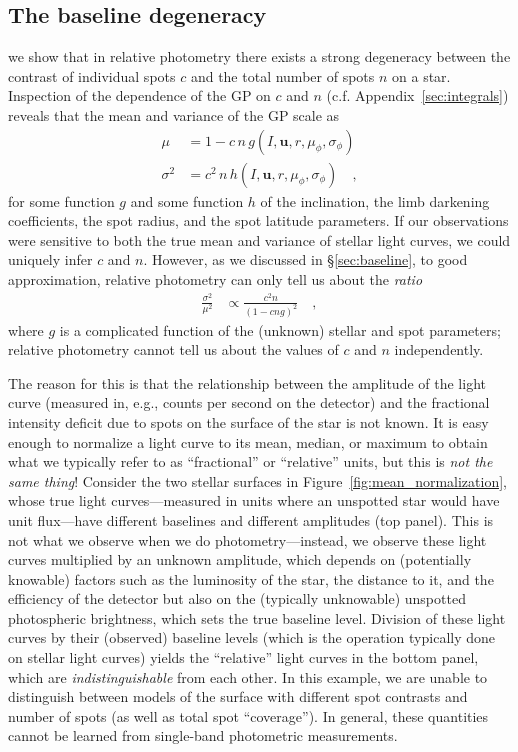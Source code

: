 \documentclass[modern]{aastex62}
\begin{document}
\subsection{The baseline degeneracy}
\label{sec:breaking_baseline_degeneracy}

 we show that in relative photometry there exists a
strong degeneracy between the contrast of individual spots $c$ and
the total number of spots $n$ on a star. Inspection of the
dependence of the GP on $c$ and $n$ (c.f. Appendix~\ref{sec:integrals}) reveals
that the mean and variance of the GP scale as
%
\begin{align}
    \mu      & = 1 - c \, n \, g (I, \mathbf{u}, r, \mu_\phi, \sigma_\phi)
    \nonumber                                                              \\
    \sigma^2 & = c^2 \, n \, h (I, \mathbf{u}, r, \mu_\phi, \sigma_\phi)
    \quad,
\end{align}
%
for some function $g$ and some function $h$ of the inclination,
the limb darkening coefficients, the spot radius, and the spot latitude
parameters.
If our observations were sensitive to both the true mean and
variance of stellar light curves,
we could uniquely infer $c$ and $n$. However, as we discussed in \S\ref{sec:baseline},
to good approximation, relative photometry can only tell us about the \emph{ratio}
%
\begin{align}
    \frac{\sigma^2}{\mu^2}
     & \propto \frac{c^2 n}{(1 - c n g)^2}
    \quad,
\end{align}
%
where $g$ is a complicated function of the (unknown) stellar and spot parameters;
relative photometry cannot tell us about the values of $c$ and $n$ independently.

The reason for this is that the relationship between the amplitude of the
light curve (measured in, e.g., counts per second on the detector)
and the fractional intensity deficit due to spots on the surface of
the star is not known. It is easy enough to normalize a light curve to its
mean, median, or maximum to obtain what we typically refer to as
``fractional'' or ``relative'' units, but this is \emph{not the same
    thing}! Consider the two stellar surfaces in Figure~\ref{fig:mean_normalization},
whose true light curves---measured in units where an unspotted star would
have unit flux---have different baselines and different amplitudes (top panel).
This is not what we observe when we do photometry---instead, we observe these
light curves multiplied by an unknown amplitude, which depends on (potentially
knowable) factors such as the luminosity of the star, the distance to it,
and the efficiency of the detector but also on the (typically unknowable)
unspotted photospheric brightness, which sets the true baseline level.
%
Division of these light curves by their (observed) baseline levels
(which is the operation typically done on stellar light curves) yields the
``relative'' light curves in the bottom panel, which are \emph{indistinguishable}
from each other. In this example, we are unable to distinguish between
models of the surface with different spot contrasts and number of spots (as well
as total spot ``coverage''). In general, these quantities cannot be learned
from single-band photometric measurements.
%
\end{document}
